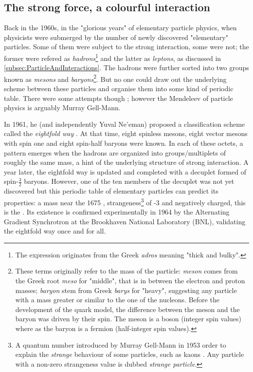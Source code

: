 \subsection{The strong force, a colourful interaction}
\label{subsec:strongforce}

Back in the 1960s, in the "glorious years" of elementary particle physics, when physicists were submerged by the number of newly discovered "elementary" particles. Some of them were subject to the strong interaction, some were not; the former were refered as \textit{hadrons}\footnote{The expression originates from the Greek \textit{adros} meaning "thick and bulky".} and the latter as \textit{leptons}, as discussed in \Sec\ref{subsec:ParticleAndInteractions}. The hadrons were further sorted into two groups known as \textit{mesons} and \textit{baryons}\footnote{These terms originally refer to the mass of the particle: \textit{meson} comes from the Greek root \textit{meso} for "middle", that is in between the electron and proton masses; \textit{baryon} stem from Greek \textit{barys} for "heavy", suggesting any particle with a mass greater or similar to the one of the nucleons. Before the development of the quark model, the difference between the meson and the baryon was driven by their spin. The meson is a boson (integer spin values) where as the baryon is a fermion (half-integer spin values)\cite{s.glashowInteractionsJourneyMind1990}.}. But no one could draw out the underlying scheme between these particles and organise them into some kind of periodic table. There were some attempts though \cite{sakataCompositeModelNew1956}\cite{sakuraiTheoryStrongInteractions1960}; however the Mendeleev of particle physics is arguably Murray Gell-Mann. 

In 1961, he (and independently Yuval Ne'eman) proposed a classification scheme called the \textit{eightfold way} \cite{gell-mannEIGHTFOLDWAYTHEORY1961}\cite{neemanDerivationStrongInteractions1961}. At that time, eight spinless mesons, eight vector mesons with spin one and eight spin-half baryons were known. In each of these octets, a pattern emerges when the hadrons are organized into groups/multiplets of roughly the same mass, a hint of the underlying structure of strong interaction. A year later, the eightfold way is updated and completed with a decuplet formed of spin-$\frac{3}{2}$ baryons. However, one of the ten members of the decuplet was not yet discovered but this periodic table of elementary particles can predict its properties: a mass near the 1675 \mmass, strangeness\footnote{A quantum number introduced by Murray Gell-Mann in 1953 order to explain the \textit{strange} behaviour of some particles, such as kaons \cite{gell-mannIsotopicSpinNew1953}. Any particle with a non-zero strangeness value is dubbed \textit{strange particle}.} of -3 and negatively charged, this is the \rmOmegaM. Its existence is confirmed experimentally in 1964 by the Alternating Gradient Synchrotron at the Brookhaven National Laboratory (BNL)\cite{barnesObservationHyperonStrangeness1964a}, validating the eightfold way once and for all.\\

